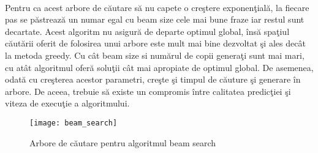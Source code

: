 \paragraph{}
Pentru ca acest arbore de c\u autare s\u a nu capete o cre\c stere exponen\c tial\u a, la fiecare pas se p\u astreaz\u a un numar egal cu beam size cele mai bune fraze iar restul sunt decartate. Acest algoritm nu asigur\u a de departe optimul global, \^ ins\u a spa\c tiul c\u aut\u arii oferit de folosirea unui arbore este mult mai bine dezvoltat \c si ales dec\^ at la metoda greedy. Cu c\^ at beam size si num\u arul de copii genera\c ti sunt mai mari, cu at\^ at algoritmul ofer\u a solu\c tii c\^ at mai apropiate de optimul global. De asemenea, odat\u a cu cre\c sterea acestor parametri, cre\c ste \c si timpul de c\u auture \c si generare \^ in arbore. De aceea, trebuie s\u a existe un compromis \^ intre calitatea predic\c tiei \c si viteza de execu\c tie a algoritmului.

\begin{figure}[H]
\centering
\texttt{[image: beam\_search]}
\caption{Arbore de c\u autare pentru algoritmul beam search}
\end{figure}